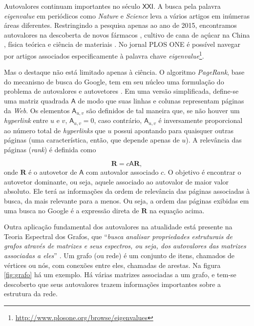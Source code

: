 	Autovalores continuam importantes no século $\mathsf{XXI}$. A busca pela palavra \emph{eigenvalue} em periódicos como \emph{Nature} e \emph{Science} leva a vários artigos em inúmeras áreas diferentes. Restringindo a pesquisa apenas ao ano de 2015, encontramos autovalores na descoberta de novos fármacos \cite{avMedicamento2015}, cultivo de cana de açúcar na China \cite{avCana2015}, física teórica \cite{avFisTeo2015} e ciência de materiais \cite{avCienciaMateriais2015}. No jornal PLOS ONE é possível navegar por artigos associados especificamente à palavra chave \emph{eigenvalue}\footnote{\href{http://www.plosone.org/browse/eigenvalues}{http://www.plosone.org/browse/eigenvalues}}.
	
	Mas o destaque não está limitado apenas à ciência. O algoritmo \emph{PageRank}, base do mecanisno de busca do Google, tem em seu núcleo uma formulação do problema de autovalores e autovetores \cite{BrinPage98}. Em uma versão simplificada, define-se uma matriz quadrada $\mathsf{A}$ de modo que suas linhas e colunas representam páginas da \emph{Web}. Os elementos $\mathsf{A}_{u,v}$ são definidos de tal maneira que, se não houver um \emph{hyperlink} entre $u$ e $v$, $\mathsf{A}_{u,v} = 0$, caso contrário, $\mathsf{A}_{u,v}$ é inversamente proporcional ao número total de \emph{hyperlinks} que $u$ possui apontando para quaisquer outras páginas (uma característica, então, que depende apenas de $u$). A relevância das páginas (\emph{rank}) é definida como
	
	\begin{equation}
		\mathsf{\textbf{R}} = c\mathsf{A}\mathsf{\textbf{R}},
	\end{equation}
	onde $\mathsf{\textbf{R}}$ é o autovetor de $\mathsf{A}$ com autovalor associado $c$. O objetivo é encontrar o autovetor dominante, ou seja, aquele associado ao autovalor de maior valor absoluto. Ele terá as informações da ordem de relevância das páginas associadas à busca, da mais relevante para a menos. Ou seja, a ordem das páginas exibidas em uma busca no Google é a expressão direta de $\mathsf{\textbf{R}}$ na equação acima.
	
	Outra aplicação fundamental dos autovalores na atualidade está presente na Teoria Espectral dos Grafos, que ``\textit{busca analisar propriedades estruturais
de grafos através de matrizes e seus espectros, ou seja,
dos autovalores das matrizes associadas a eles}'' \cite{TEG2014}. Um grafo (ou rede) é um conjunto de itens, chamados de vértices ou nós, com conexões entre eles, chamadas de arestas. Na figura \ref{fig:grafo} há um exemplo. Há várias matrizes associadas a um grafo, e tem-se descoberto que seus autovalores trazem informações importantes sobre a estrutura da rede.
	
